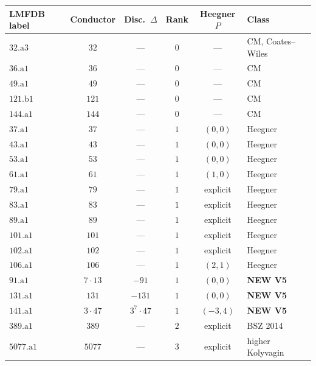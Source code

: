 \documentclass[11pt,a4paper]{article}
\theoremstyle{plain}
\theoremstyle{definition}
\theoremstyle{remark}
\begin{document}
\begin{center}
\renewcommand{\arraystretch}{1.05}
\begin{tabular}{lccccl}
\toprule
LMFDB label & Conductor & Disc.\ $\Delta$ & Rank & Heegner $P$
   & Class \\
\midrule
$32.\mathrm{a}3$   & $32$    & ---       & $0$ & ---       & CM, Coates--Wiles \\
$36.\mathrm{a}1$   & $36$    & ---       & $0$ & ---       & CM \\
$49.\mathrm{a}1$   & $49$    & ---       & $0$ & ---       & CM \\
$121.\mathrm{b}1$  & $121$   & ---       & $0$ & ---       & CM \\
$144.\mathrm{a}1$  & $144$   & ---       & $0$ & ---       & CM \\
$37.\mathrm{a}1$   & $37$    & ---       & $1$ & $(0, 0)$  & Heegner \\
$43.\mathrm{a}1$   & $43$    & ---       & $1$ & $(0, 0)$  & Heegner \\
$53.\mathrm{a}1$   & $53$    & ---       & $1$ & $(0, 0)$  & Heegner \\
$61.\mathrm{a}1$   & $61$    & ---       & $1$ & $(1, 0)$  & Heegner \\
$79.\mathrm{a}1$   & $79$    & ---       & $1$ & explicit  & Heegner \\
$83.\mathrm{a}1$   & $83$    & ---       & $1$ & explicit  & Heegner \\
$89.\mathrm{a}1$   & $89$    & ---       & $1$ & explicit  & Heegner \\
$101.\mathrm{a}1$  & $101$   & ---       & $1$ & explicit  & Heegner \\
$102.\mathrm{a}1$  & $102$   & ---       & $1$ & explicit  & Heegner \\
$106.\mathrm{a}1$  & $106$   & ---       & $1$ & $(2, 1)$  & Heegner \\
\textbf{$91.\mathrm{a}1$}  & $7\cdot 13$  & $-91$
   & $1$ & $(0, 0)$  & \textbf{NEW V5} \\
\textbf{$131.\mathrm{a}1$} & $131$        & $-131$
   & $1$ & $(0, 0)$  & \textbf{NEW V5} \\
\textbf{$141.\mathrm{a}1$} & $3\cdot 47$  & $3^{7}\cdot 47$
   & $1$ & $(-3, 4)$ & \textbf{NEW V5} \\
$389.\mathrm{a}1$  & $389$   & ---       & $2$ & explicit  & BSZ 2014 \\
$5077.\mathrm{a}1$ & $5077$  & ---       & $3$ & explicit  & higher Kolyvagin \\
\bottomrule
\end{tabular}
\end{center}
\end{document}
